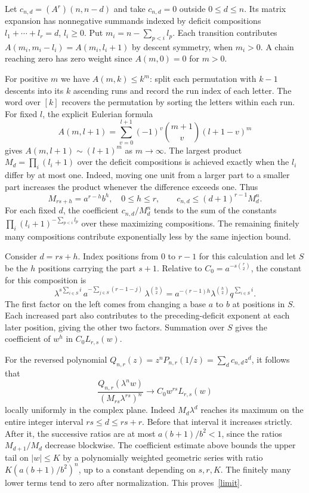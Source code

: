 \documentclass[11pt]{article}
\begin{document}
Let $c_{n,d}=(A^r)(n,n-d)$ and take $c_{n,d}=0$ outside $0\le d\le n$. Its matrix expansion has nonnegative summands indexed by deficit compositions $l_1+\cdots+l_r=d$, $l_i\ge0$. Put $m_i=n-\sum_{p<i}l_p$. Each transition contributes $A(m_i,m_i-l_i)=A(m_i,l_i+1)$ by descent symmetry, when $m_i>0$. A chain reaching zero has zero weight since $A(m,0)=0$ for $m>0$.

For positive $m$ we have $A(m,k)\le k^m$: split each permutation with $k-1$ descents into its $k$ ascending runs and record the run index of each letter. The word over $[k]$ recovers the permutation by sorting the letters within each run. For fixed $l$, the explicit Eulerian formula
\begin{equation}\label{explicit}
 A(m,l+1)=\sum_{v=0}^{l+1}(-1)^v\binom{m+1}{v}(l+1-v)^m
\end{equation}
gives $A(m,l+1)\sim(l+1)^m$ as $m\to\infty$. The largest product $M_d=\prod_i(l_i+1)$ over the deficit compositions is achieved exactly when the $l_i$ differ by at most one. Indeed, moving one unit from a larger part to a smaller part increases the product whenever the difference exceeds one. Thus
\[
 M_{rs+h}=a^{r-h}b^h,\quad 0\le h\le r,\qquad
 c_{n,d}\le(d+1)^{r-1}M_d^n .
\]
For each fixed $d$, the coefficient $c_{n,d}/M_d^n$ tends to the sum of the constants $\prod_i(l_i+1)^{-\sum_{p<i}l_p}$ over these maximizing compositions. The remaining finitely many compositions contribute exponentially less by the same injection bound.

Consider $d=rs+h$. Index positions from $0$ to $r-1$ for this calculation and let $S$ be the $h$ positions carrying the part $s+1$. Relative to $C_0=a^{-s\binom r2}$, the constant for this composition is
\[
 \lambda^{s\sum_{i\in S} i}\, a^{-\sum_{j\in S}(r-1-j)}\,\lambda^{\binom h2}
 =a^{-(r-1)h}\lambda^{\binom h2}q^{\sum_{i\in S}i} .
\]
The first factor on the left comes from changing a base $a$ to $b$ at positions in $S$. Each increased part also contributes to the preceding-deficit exponent at each later position, giving the other two factors. Summation over $S$ gives the coefficient of $w^h$ in $C_0 L_{r,s}(w)$.

For the reversed polynomial $Q_{n,r}(z)=z^nP_{n,r}(1/z)=\sum_d c_{n,d}z^d$, it follows that
\begin{equation}\label{limit}
 \frac{Q_{n,r}(\lambda^n w)}{(M_{rs}\lambda^{rs})^n}
 \longrightarrow C_0 w^{rs}L_{r,s}(w)
\end{equation}
locally uniformly in the complex plane. Indeed $M_d\lambda^d$ reaches its maximum on the entire integer interval $rs\le d\le rs+r$. Before that interval it increases strictly. After it, the successive ratios are at most $a(b+1)/b^2<1$, since the ratios $M_{d+1}/M_d$ decrease blockwise. The coefficient estimate above bounds the upper tail on $|w|\le K$ by a polynomially weighted geometric series with ratio $K(a(b+1)/b^2)^n$, up to a constant depending on $s,r,K$. The finitely many lower terms tend to zero after normalization. This proves~\eqref{limit}.
\end{document}
